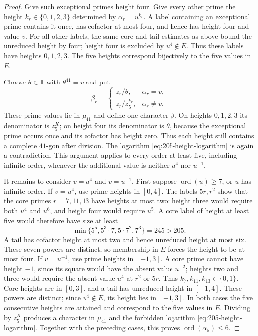\documentclass[11pt,reqno]{amsart}
\newcommand{\T}{\mathbb T}
\theoremstyle{definition}
\theoremstyle{remark}
\numberwithin{equation}{section}
\begin{document}
\begin{proof}
Give such exceptional primes height four. Give every other prime
the height $k_r\in\{0,1,2,3\}$ determined by $\alpha_r=u^{k_r}$.
A label containing an exceptional prime contains it once, has cofactor
at most four, and hence has height four and value $v$.
For all other labels, the same core and tail estimates as above bound
the unreduced height by four; height four is excluded by $u^4\notin E$.
Thus these labels have heights $0,1,2,3$. The five heights correspond
bijectively to the five values in $E$.

Choose $\theta\in\T$ with $\theta^{41}=v$ and put
\[
 \beta_r=
 \begin{cases}
 z_r/\theta,&\alpha_r=v,\\
 z_r/z_5^{k_r},&\alpha_r\ne v.
 \end{cases}
\]
These prime values lie in $\mu_{41}$ and define one character
$\beta$. On heights $0,1,2,3$ its denominator is $z_5^K$; on height
four its denominator is $\theta$, because the exceptional prime occurs
once and its cofactor has height zero. Thus each height still contains
a complete $41$-gon after division. The logarithm
\eqref{eq:205-height-logarithm} is again a contradiction.
This argument applies to every order at least five, including infinite
order, whenever the additional value is neither $u^4$ nor $u^{-1}$.

It remains to consider $v=u^4$ and $v=u^{-1}$. First suppose
$\operatorname{ord}(u)\ge7$, or $u$ has infinite order.
If $v=u^4$, use prime heights in $[0,4]$.
The labels $5r,r^2$ show that the core primes $r=7,11,13$ have
heights at most two: height three would require both $u^4$ and $u^6$,
and height four would require $u^5$. A core label of height at least
five would therefore have size at least
\[
 \min\{5^5,5^3\cdot7,5\cdot7^2,7^3\}=245>205.
\]
A tail has cofactor height at most two and hence unreduced height at
most six. These seven powers are distinct, so membership in $E$ forces
the height to be at most four.
If $v=u^{-1}$, use prime heights in $[-1,3]$. A core prime cannot
have height $-1$, since its square would have the absent value $u^{-2}$;
heights two and three would require the absent value $u^4$ at $r^2$
or $5r$. Thus $k_7,k_{11},k_{13}\in\{0,1\}$.
Core heights are in $[0,3]$, and a tail has unreduced height in
$[-1,4]$. These powers are distinct; since $u^4\notin E$, its height
lies in $[-1,3]$. In both cases the five consecutive heights
are attained and correspond to the five values in $E$. Dividing by $z_5^K$
produces a character in $\mu_{41}$ and the forbidden logarithm
\eqref{eq:205-height-logarithm}. Together with the preceding cases,
this proves $\operatorname{ord}(\alpha_5)\le6$.


\end{proof}
\end{document}
